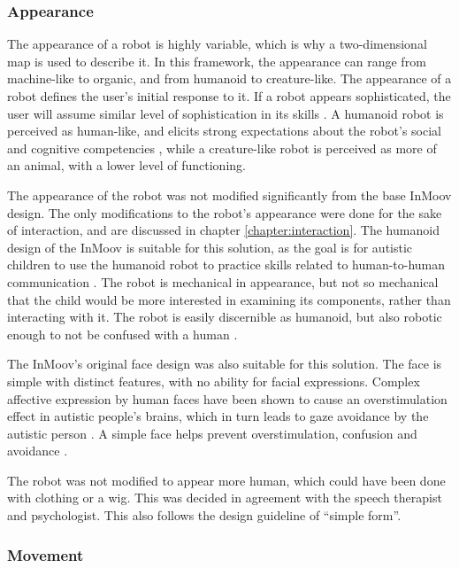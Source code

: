 \subsubsection{Appearance}


The appearance of a robot is highly variable, which is why a two-dimensional map is used to describe it. In this framework, the appearance can range from machine-like to organic, and from humanoid to creature-like. The appearance of a robot defines the user's initial response to it. If a robot appears sophisticated, the user will assume similar level of sophistication in its skills \cite{bartneck2004design,designSpaces}. A humanoid robot is perceived as human-like, and elicits strong expectations about the robot's social and cognitive competencies \cite{designSpaces}, while a creature-like robot is perceived as more of an animal, with a lower level of functioning. 

The appearance of the robot was not modified significantly from the base InMoov design. The only modifications to the robot's appearance were done for the sake of interaction, and are discussed in chapter \ref{chapter:interaction}. The humanoid design of the InMoov is suitable for this solution, as the goal is for autistic children to use the humanoid robot to practice skills related to human-to-human communication \cite{designSpaces}. The robot is mechanical in appearance, but not so mechanical that the child would be more interested in examining its components, rather than interacting with it. The robot is easily discernible as humanoid, but also robotic enough to not be confused with a human \cite{giullian2010detailed}.

The InMoov's original face design was also suitable for this solution. The face is simple with distinct features, with no ability for facial expressions. Complex affective expression by human faces have been shown to cause an overstimulation effect in autistic people's brains, which in turn leads to gaze avoidance by the autistic person \cite{dalton2005gaze}. A simple face helps prevent overstimulation, confusion and avoidance \cite{giullian2010detailed}.

The robot was not modified to appear more human, which could have been done with clothing or a wig. This was decided in agreement with the speech therapist and psychologist. This also follows the design guideline of ``simple form''.


\subsubsection{Movement}

